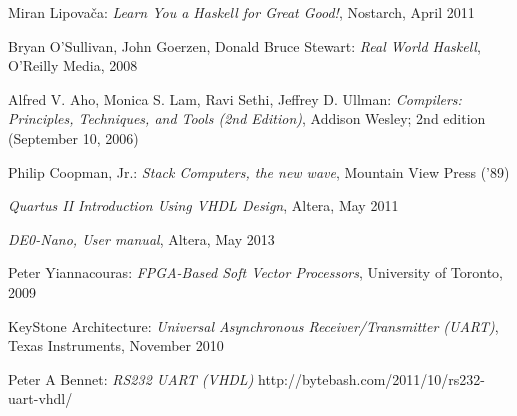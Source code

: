 \begin{thebibliography}{99}
 Miran Lipovača:
\emph{Learn You a Haskell for Great Good!},
Nostarch, April 2011

 Bryan O'Sullivan, John Goerzen, Donald Bruce Stewart:
\emph{Real World Haskell},
O'Reilly Media, 2008

 Alfred V. Aho, Monica S. Lam, Ravi Sethi, Jeffrey D. Ullman:
\emph{Compilers: Principles, Techniques, and Tools (2nd Edition)},
Addison Wesley; 2nd edition (September 10, 2006)


 Philip Coopman, Jr.:
\emph{Stack Computers, the new wave},
Mountain View Press ('89)

\emph{Quartus II Introduction Using VHDL Design},
Altera, May 2011

\emph{DE0-Nano, User manual},
Altera, May 2013


 Peter Yiannacouras:
\emph{FPGA-Based Soft Vector Processors},
University of Toronto, 2009

 KeyStone Architecture:
\emph{Universal Asynchronous Receiver/Transmitter (UART)},
Texas Instruments, November 2010

Peter A Bennet:
\emph{RS232 UART (VHDL)}
http://bytebash.com/2011/10/rs232-uart-vhdl/

\end{thebibliography}
